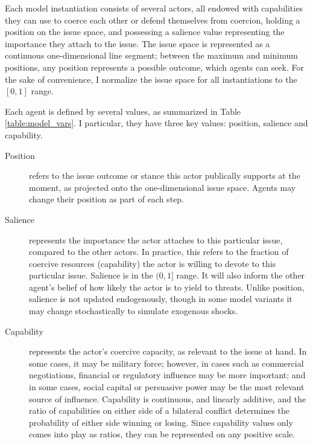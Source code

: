 
Each model instantiation consists of several actors, all endowed with capabilities they can use to coerce each other or defend themselves from coercion, holding a position on the issue space, and possessing a salience value representing the importance they attach to the issue. The issue space is represented as a continuous one-dimensional line segment; between the maximum and minimum positions, any position represents a possible outcome, which agents can seek. For the sake of convenience, I normalize the issue space for all instantiations to the ${[0, 1]}$ range. 

Each agent is defined by several values, as summarized in Table \ref{table:model_vars}. I particular, they have three key values: position, salience and capability.
\begin{description}
    \item[Position] refers to the issue outcome or stance this actor publically supports at the moment, as projected onto the one-dimensional issue space. Agents may change their position as part of each step.

    \item[Salience] represents the importance the actor attaches to this particular issue, compared to the other actors. In practice, this refers to the fraction of coercive resources (capability) the actor is willing to devote to this particular issue. Salience is in the ${(0, 1]}$ range. It will also inform the other agent's belief of how likely the actor is to yield to threats. Unlike position, salience is not updated endogenously, though in some model variants it may change stochastically to simulate exogenous shocks.

    \item[Capability] represents the actor's coercive capacity, as relevant to the issue at hand. In some cases, it may be military force; however, in cases such as commercial negotiations, financial or regulatory influence may be more important; and in some cases, social capital or persuasive power may be the most relevant source of influence. Capability is continuous, and linearly additive, and the ratio of capabilities on either side of a bilateral conflict determines the probability of either side winning or losing. Since capability values only comes into play as ratios, they can be represented on any positive scale.
\end{description}


